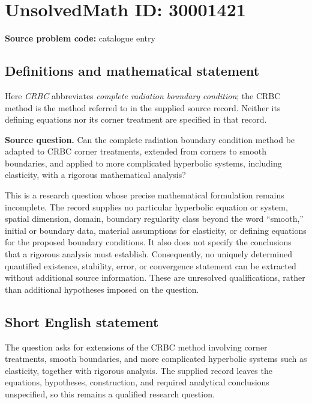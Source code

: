\documentclass[11pt]{article}
\begin{document}
\section*{UnsolvedMath ID: 30001421}
\textbf{Source problem code:} catalogue entry
\subsection{Definitions and mathematical statement}
Here \emph{CRBC} abbreviates \emph{complete radiation boundary condition}; the CRBC method is the method referred to in the supplied source record. Neither its defining equations nor its corner treatment are specified in that record.

\textbf{Source question.} Can the complete radiation boundary condition method be adapted to CRBC corner treatments, extended from corners to smooth boundaries, and applied to more complicated hyperbolic systems, including elasticity, with a rigorous mathematical analysis?

This is a research question whose precise mathematical formulation remains incomplete. The record supplies no particular hyperbolic equation or system, spatial dimension, domain, boundary regularity class beyond the word ``smooth,'' initial or boundary data, material assumptions for elasticity, or defining equations for the proposed boundary conditions. It also does not specify the conclusions that a rigorous analysis must establish. Consequently, no uniquely determined quantified existence, stability, error, or convergence statement can be extracted without additional source information. These are unresolved qualifications, rather than additional hypotheses imposed on the question.
\subsection{Short English statement}
The question asks for extensions of the CRBC method involving corner treatments, smooth boundaries, and more complicated hyperbolic systems such as elasticity, together with rigorous analysis. The supplied record leaves the equations, hypotheses, construction, and required analytical conclusions unspecified, so this remains a qualified research question.
\end{document}
